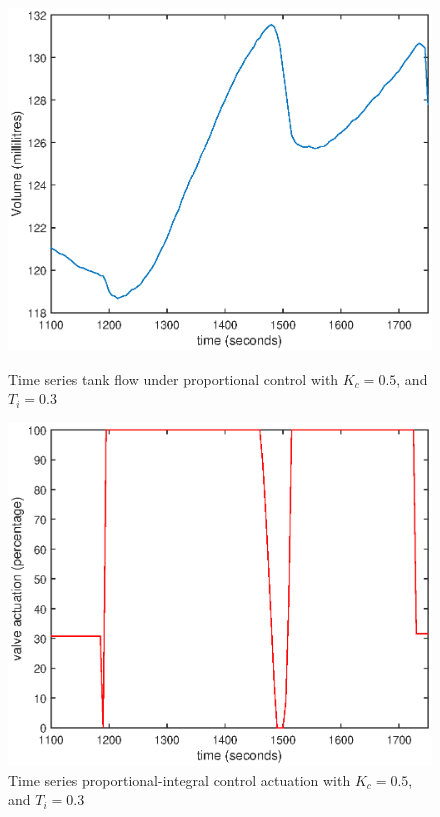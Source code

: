 \documentclass{article}
\begin{document}
\begin{figure}[h]
	\centering
	\begin{minipage}{0.45\textwidth}
		\centering
		\includegraphics[scale=0.4]{PI_Kc_05_Ti_03}
		\caption{Time series tank flow under proportional control with $K_c = 0.5$, and $T_i = 0.3$}
	\end{minipage}
	\hspace{0.5cm}
	\begin{minipage}{0.45\textwidth}
		\centering
		\includegraphics[scale=0.4]{PI_Kc_05_Ti_03_control}
		\caption{Time series proportional-integral control actuation with $K_c = 0.5$, and $T_i = 0.3$}
	\end{minipage}
\end{figure}
\end{document}
